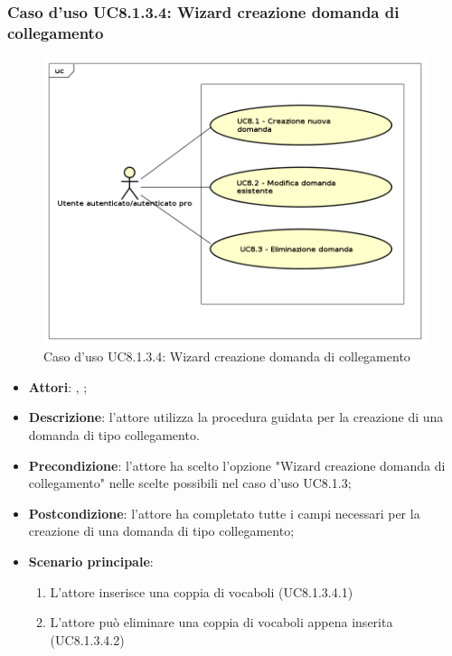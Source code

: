 \subsubsection{Caso d'uso UC8.1.3.4: Wizard creazione domanda di collegamento}
\label{UC8.1.3.4}
\begin{figure}[h]
	\centering
\includegraphics[scale=0.5,keepaspectratio]{UML/UC8.png}
	\caption{Caso d'uso UC8.1.3.4: Wizard creazione domanda di collegamento}
\end{figure}
\FloatBarrier
\begin{itemize}
	\item \textbf{Attori}: \uau, \uaupro;
	\item \textbf{Descrizione}: l'attore utilizza la procedura guidata per la creazione di una domanda di tipo collegamento. 
	\item \textbf{Precondizione}: l'attore ha scelto l'opzione "Wizard creazione domanda di collegamento" nelle scelte possibili nel caso d'uso UC8.1.3;
	\item \textbf{Postcondizione}: l'attore ha completato tutte i campi necessari per la creazione di una domanda di tipo collegamento;
	\item \textbf{Scenario principale}: 
		\begin{enumerate}
			\item L'attore inserisce una coppia di vocaboli (UC8.1.3.4.1)
			\item L'attore può eliminare una coppia di vocaboli appena inserita (UC8.1.3.4.2)
		\end{enumerate}
\end{itemize}







